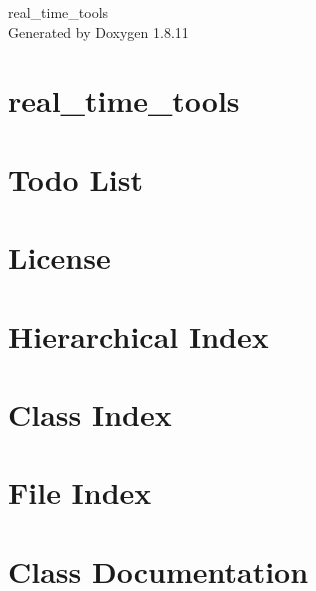 \documentclass[twoside]{book}
\newcommand{\+}{\discretionary{\mbox{\scriptsize$\hookleftarrow$}}{}{}}
\newcommand{\clearemptydoublepage}{%
  \newpage{\pagestyle{empty}\cleardoublepage}%
}
\begin{document}
\hypersetup{pageanchor=false,
             bookmarksnumbered=true,
             pdfencoding=unicode
            }
\begin{titlepage}
\vspace*{7cm}
\begin{center}%
{\Large real\+\_\+time\+\_\+tools }\\
\vspace*{1cm}
{\large Generated by Doxygen 1.8.11}\\
\end{center}
\end{titlepage}
\clearemptydoublepage
\tableofcontents
\clearemptydoublepage
{}
\hypersetup{pageanchor=true}

\chapter{real\+\_\+time\+\_\+tools}
\label{index}\hypertarget{index}{}
\chapter{Todo List}
\label{todo}
\hypertarget{todo}{}

\chapter{License}
\label{license}
\hypertarget{license}{}

\chapter{Hierarchical Index}

\chapter{Class Index}

\chapter{File Index}

\chapter{Class Documentation}

















\end{document}
